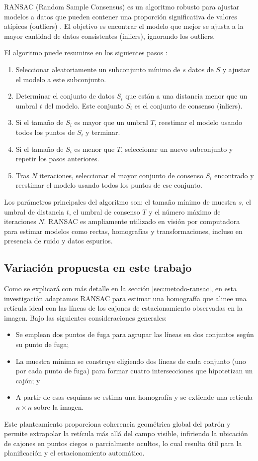 

RANSAC (Random Sample Consensus) es un algoritmo robusto para ajustar modelos a datos que pueden contener una proporción significativa de valores atípicos (outliers) \cite{fischler1981ransac,hartley2003multiple}. El objetivo es encontrar el modelo que mejor se ajusta a la mayor cantidad de datos consistentes (inliers), ignorando los outliers.

El algoritmo puede resumirse en los siguientes pasos \cite[Alg. 4.4]{hartley2003multiple}:
\begin{enumerate}
	\item Seleccionar aleatoriamente un subconjunto mínimo de $s$ datos de $S$ y ajustar el modelo a este subconjunto.
	\item Determinar el conjunto de datos $S_i$ que están a una distancia menor que un umbral $t$ del modelo. Este conjunto $S_i$ es el conjunto de consenso (inliers).
	\item Si el tamaño de $S_i$ es mayor que un umbral $T$, reestimar el modelo usando todos los puntos de $S_i$ y terminar.
	\item Si el tamaño de $S_i$ es menor que $T$, seleccionar un nuevo subconjunto y repetir los pasos anteriores.
	\item Tras $N$ iteraciones, seleccionar el mayor conjunto de consenso $S_i$ encontrado y reestimar el modelo usando todos los puntos de ese conjunto.
\end{enumerate}

Los parámetros principales del algoritmo son: el tamaño mínimo de muestra $s$, el umbral de distancia $t$, el umbral de consenso $T$ y el número máximo de iteraciones $N$. RANSAC es ampliamente utilizado en visión por computadora para estimar modelos como rectas, homografías y transformaciones, incluso en presencia de ruido y datos espurios.


\subsection{Variación propuesta en este trabajo}\label{sec:aply-ransac}
Como se explicará con más detalle en la sección \ref{sec:metodo-ransac}, 
en esta investigación adaptamos RANSAC para estimar una homografía que alinee una retícula ideal 
con las líneas de los cajones de estacionamiento observadas en la imagen. 
Bajo las siguientes consideraciones generales: 
\begin{itemize}
\item Se emplean dos puntos de fuga para agrupar las líneas en dos conjuntos según su punto de fuga; 
\item La muestra mínima se construye eligiendo dos líneas de cada conjunto (uno por cada punto de fuga) para formar cuatro intersecciones 
que hipotetizan un cajón; y 
\item A partir de esas esquinas se estima una homografía y se extiende una retícula \(n\times n\) 
sobre la imagen.
\end{itemize}

Este planteamiento proporciona coherencia geométrica global del patrón 
y permite extrapolar la retícula más allá del campo visible, infiriendo la ubicación de cajones 
en puntos ciegos o parcialmente ocultos, lo cual resulta útil para la planificación 
y el estacionamiento automático.
